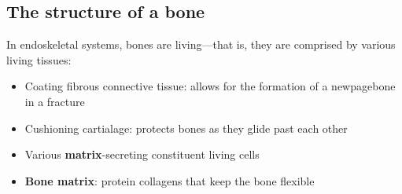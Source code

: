 \documentclass{article}
\begin{document}
\subsection{The structure of a bone}

In endoskeletal systems, bones are living---that is, they are comprised by
various living tissues:

\begin{itemize}
    \item Coating fibrous connective tissue: allows for the formation of a
    newpagebone in a fracture
    \item Cushioning cartialage: protects bones as they glide past each other
    \item Various \textbf{matrix}-secreting constituent living cells
    \item \textbf{Bone matrix}: protein collagens that keep the bone flexible
\end{itemize}
\end{document}
